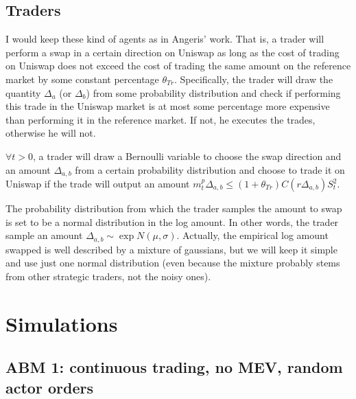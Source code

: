 \documentclass[a4paper,11pt]{article}
\begin{document}
\subsection{Traders}
I would keep these kind of agents as in Angeris’ work. That is, a trader will perform a swap in a certain direction on Uniswap as long as the cost of trading on Uniswap does not exceed the cost of trading the same amount on the reference market by some constant percentage $\theta_{Tr}$. Specifically, the trader will draw the quantity $\Delta_a$ (or $\Delta_b$) from some probability distribution and check if performing this trade in the Uniswap market is at most some percentage more expensive than performing it in the reference market. If not, he executes the trades, otherwise he will not.

$\forall t>0$, a trader will draw a Bernoulli variable to choose the swap direction and an amount $\Delta_{a,b}$ from a certain probability distribution and choose to trade it on Uniswap if the trade will output an amount $ m_t^p\Delta_{a,b} \leq (1+\theta_{Tr})C(r\Delta_{a,b})S^2_t $.

The probability distribution from which the trader samples the amount to swap is set to be a normal distribution in the log amount. In other words, the trader sample an amount $\Delta_{a,b} \sim \exp{N(\mu, \sigma)}$. Actually, the empirical log amount swapped is well described by a  mixture of gaussians, but we will keep it simple and use just one normal distribution (even because the mixture probably stems from other strategic traders, not the noisy ones).

\section{Simulations}
\subsection{ABM 1: continuous trading, no MEV, random actor orders}
\end{document}
